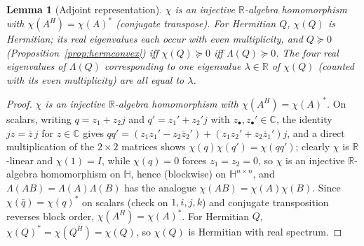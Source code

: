 \documentclass{amsart}
\newtheorem{lemma}[theorem]{Lemma}
\theoremstyle{definition}
\newcommand{\HH}{\mathbb{H}}
\newcommand{\RR}{\mathbb{R}}
\newcommand{\CC}{\mathbb{C}}
\begin{document}
\begin{lemma}[Adjoint representation]
\label{lem:chi}
$\chi$ is an injective $\RR$-algebra homomorphism with
$\chi(A^H)=\chi(A)^{*}$ (conjugate transpose). For Hermitian
$Q$, $\chi(Q)$ is Hermitian; its real eigenvalues each occur with even
multiplicity, and $Q\succeq0$ \textup{(}Proposition~\ref{prop:hermconvex}\textup{)}
iff $\chi(Q)\succeq0$ iff $\Lambda(Q)\succeq0$. The four real
eigenvalues of $\Lambda(Q)$ corresponding to one eigenvalue
$\lambda\in\RR$ of $\chi(Q)$ \textup{(}counted with its even
multiplicity\textup{)} are all equal to $\lambda$.
\end{lemma}

\begin{proof}
\emph{$\chi$ is an injective $\RR$-algebra homomorphism with
$\chi(A^H)=\chi(A)^*$.} On scalars, writing $q=z_1+z_2j$ and
$q'=z_1'+z_2'j$ with $z_\bullet,z_\bullet'\in\CC$, the identity
$jz=\bar z\,j$ for $z\in\CC$ gives
$qq'=(z_1z_1'-z_2\bar z_2')+(z_1z_2'+z_2\bar z_1')j$, and a direct
multiplication of the $2\times2$ matrices shows
$\chi(q)\chi(q')=\chi(qq')$; clearly $\chi$ is $\RR$-linear and
$\chi(1)=I$, while $\chi(q)=0$ forces $z_1=z_2=0$, so $\chi$ is an
injective $\RR$-algebra homomorphism on $\HH$, hence (blockwise) on
$\HH^{n\times n}$, and $\Lambda(AB)=\Lambda(A)\Lambda(B)$ has the
analogue $\chi(AB)=\chi(A)\chi(B)$. Since
$\chi(\bar q)=\chi(q)^*$ on scalars (check on $1,i,j,k$) and conjugate
transposition reverses block order, $\chi(A^H)=\chi(A)^*$. For Hermitian
$Q$, $\chi(Q)^*=\chi(Q^H)=\chi(Q)$, so $\chi(Q)$ is Hermitian with real
spectrum.


\end{proof}
\end{document}
